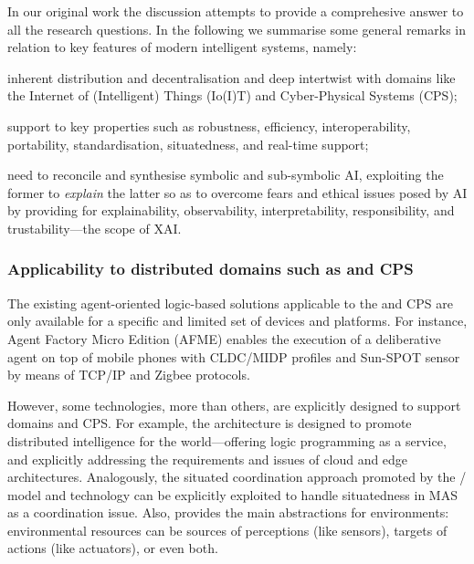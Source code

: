 \documentclass[12pt,a4paper,openright,twoside]{book}
\begin{document}
In our original work the discussion attempts to provide a comprehesive answer to all the \slr{} research questions.
%
In the following we summarise some general remarks in relation to key features of modern intelligent systems, namely:
%
\begin{inlinelist}
    \item inherent distribution and decentralisation and deep intertwist with domains like the Internet of (Intelligent) Things (Io(I)T) and Cyber-Physical Systems (CPS);
    \item support to key properties such as robustness, efficiency, interoperability, portability, standardisation, situatedness, and real-time support;
    \item need to reconcile and synthesise symbolic and sub-symbolic AI, exploiting the former to \emph{explain} the latter so as to overcome fears and ethical issues posed by AI by providing for explainability, observability, interpretability, responsibility, and trustability---the scope of XAI.
\end{inlinelist}

\subsubsection{Applicability to distributed domains such as \iot{} and CPS}

The existing agent-oriented logic-based solutions applicable to the \iot{} and CPS are only available for a specific and limited set of devices and platforms.
%
For instance, Agent Factory Micro Edition (AFME) \cite{afme-iccs2006} enables the execution of a deliberative agent on top of mobile phones with CLDC/MIDP profiles and Sun-SPOT sensor by means of TCP/IP and Zigbee protocols.

However, some technologies, more than others, are explicitly designed to support \iot{} domains and CPS.
%
For example, the \lpaas{} architecture \cite{lpaas-tplp18} is designed to promote distributed intelligence for the \iot{} world---offering logic programming as a service, and explicitly addressing the requirements and issues of cloud and edge architectures.
%
Analogously, the situated coordination approach promoted by the \tucson{}/\respect{} model and technology can be explicitly exploited to handle situatedness in MAS as a coordination issue.
%
Also, \tucson{} \cite{tucson-jaamas2} provides the main abstractions for \iot{} environments: environmental resources can be sources of perceptions (like sensors), targets of actions (like actuators), or even both.
\end{document}
